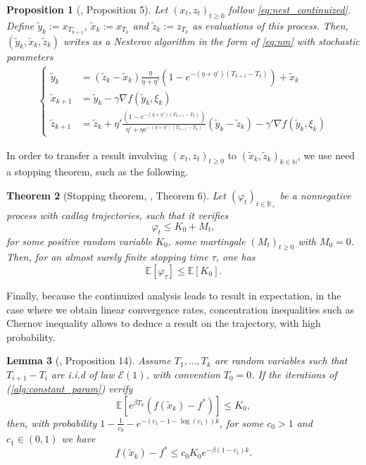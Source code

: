 \documentclass{article}
\def\R{{\mathbb{R}}}
\def\N{{\mathbb{N}}}
\def\xz{(x_t,z_t)_{t\ge 0}}
\def\mart{(M_t)_{t\ge 0}}
\newcommand{\bpar}[1]{\left(#1\right)}
\newcommand{\E}[1]{\mathbb{E}\left[#1 \right]}
\theoremstyle{plain}
\newtheorem{theorem}{Theorem}[section]
\newtheorem{proposition}[theorem]{Proposition}
\newtheorem{lemma}[theorem]{Lemma}
\theoremstyle{definition}
\theoremstyle{remark}
\begin{document}
\begin{proposition}[\cite{hermant2025continuized}, Proposition 5]\label{prop:discretization_constant_param}
Let $\xz$ follow \eqref{eq:nest_continuized}. Define $\tilde{y}_k := x_{T_{k+1}^-}$, $\tilde{x}_k := x_{T_{k}}$ and $\tilde{z}_k := z_{T_{k}}$ as evaluations of this process. Then, $(\tilde{y}_k,\tilde{x}_k, \tilde{z}_k)$ writes as a Nesterov algorithm in the form of \eqref{eq:nm} with stochastic parameters 
\begin{align}\label{alg:constant_param}\left\{
    \begin{array}{ll}
        \tilde{y}_k &= (\tilde{z}_{k} - \tilde{x}_k)\frac{\eta}{\eta+\eta'}\bpar{1 -e^{-(\eta + \eta')(T_{k+1}-T_k)} } + \tilde{x}_k \\
        \tilde{x}_{k+1} &=  \tilde{y}_k  - \gamma \nabla f(\tilde{y}_k,\xi_k)\\
        \tilde{z}_{k+1} &=   \tilde{z}_{k} + \eta' \frac{\bpar{1- e^{-(\eta+\eta')(T_{k+1}-T_k)}}}{\eta' + \eta e^{-(\eta+\eta')(T_{k+1}-T_k)}}(\tilde{y}_k - \tilde{z}_{k}) - \gamma' \nabla f(\tilde{y}_k,\xi_k)
    \end{array}
\right.
\end{align}
\end{proposition}
In order to transfer a result involving $\xz$ to $(\tilde x_k,\tilde z_k)_{k\in\N}$, we use need a stopping theorem, such as the following.
\begin{theorem}[Stopping theorem, \cite{hermant2025continuized}, Theorem 6]\label{thm:martingal_stopping}
    Let $(\varphi_t)_{t\in \R_+}$ be a nonnegative process with cadlag trajectories, such that it verifies
    $$ \varphi_t \le K_0 + M_t, $$
    for some positive random variable $K_0$, some martingale $\mart$ with $M_0 = 0$. Then, for an almost surely finite stopping time $\tau$, one has 
$$ \E{\varphi_\tau} \le \E{K_0}.$$
\end{theorem}
Finally, because the continuized analysis leads to result in expectation, in the case where we obtain linear convergence rates, concentration inequalities such as Chernov inequality allows to deduce a result on the trajectory, with high probability.
\begin{lemma}[\cite{hermant2025continuized}, Proposition 14]\label{lem:conv_high_proba}
     Assume $T_1,\dots,T_k$ are random variables such that $T_{i+1} - T_i$ are  i.i.d  of law $\mathcal{E}(1)$, with convention $T_0 = 0$. If the iterations of (\ref{alg:constant_param}) verify
                     \begin{equation}\label{eq:a.s.:2}       \mathbb{E}\left[e^{\beta T_k}(f(\tilde{x}_k)-f^\ast)\right] \le K_0,
         \end{equation}
     then, with probability  $1-\frac{1}{c_0} - e^{-(c_1-1-\log(c_1))k}$, for some $c_0 > 1$ and $c_1 \in (0,1)$ we have
         \begin{equation*}
    f(\tilde{x}_k)-f^\ast \le c_0K_0e^{-\beta(1-c_1)k}.
    \end{equation*}
\end{lemma}
\end{document}
